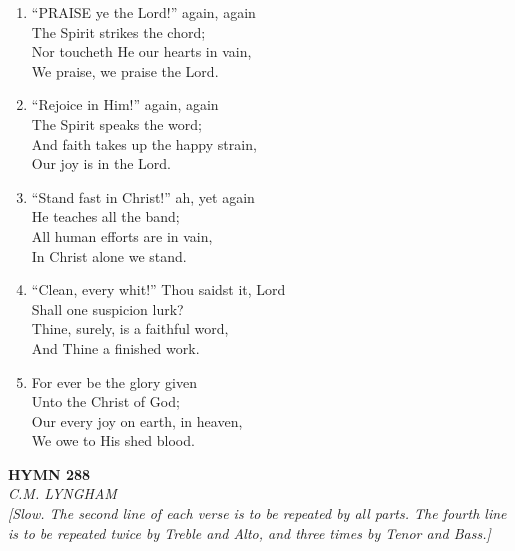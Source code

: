 \documentclass[11pt,a4paper]{article}
\begin{document}
\begin{enumerate}
    \item ``PRAISE ye the Lord!'' again, again \\
        The Spirit strikes the chord; \\
        Nor toucheth He our hearts in vain, \\
        We praise, we praise the Lord.

    \item ``Rejoice in Him!'' again, again \\
        The Spirit speaks the word; \\
        And faith takes up the happy strain, \\
        Our joy is in the Lord.

    \item ``Stand fast in Christ!'' ah, yet again \\
        He teaches all the band; \\
        All human efforts are in vain, \\
        In Christ alone we stand.

    \item ``Clean, every whit!'' Thou saidst it, Lord \\
        Shall one suspicion lurk? \\
        Thine, surely, is a faithful word, \\
        And Thine a finished work.

    \item For ever be the glory given \\
        Unto the Christ of God; \\
        Our every joy on earth, in heaven, \\
        We owe to His shed blood.

\end{enumerate}

\newpage
\begin{center}
    {\Large \textbf{HYMN 288}}
    \\
    \textit{C.M. LYNGHAM}
    \\
    \textit{\small [Slow. The second line of each verse is to be repeated by all parts. The fourth line is to be repeated twice by Treble and Alto, and three times by Tenor and Bass.]}
\end{center}
\vspace{1em}
\end{document}
